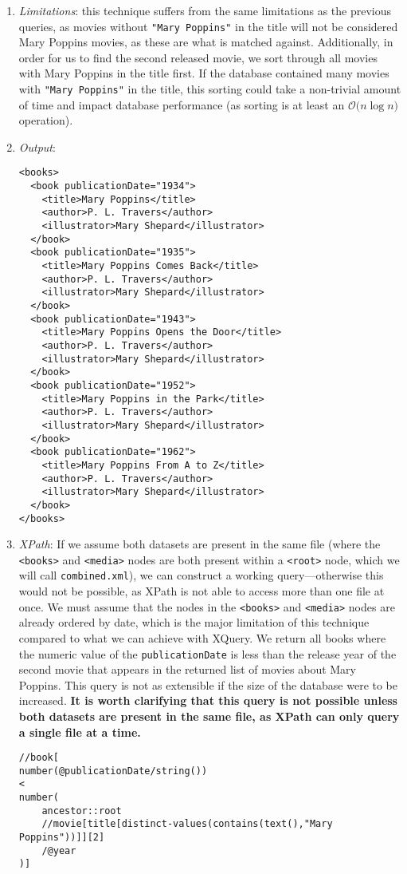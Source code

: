 \documentclass[11pt]{article}
\begin{document}
\begin{enumerate}
\item \textit{Limitations}: this technique suffers from the same limitations as the previous queries, as movies without \texttt{"Mary Poppins"} in the title will not be considered Mary Poppins movies, as these are what is matched against. Additionally, in order for us to find the second released movie, we sort through all movies with Mary Poppins in the title first. If the database contained many movies with \texttt{"Mary Poppins"} in the title, this sorting could take a non-trivial amount of time and impact database performance (as sorting is at least an $\mathcal{O}({n\log{n})}$ operation).
\item \textit{Output}:
\begin{verbatim} 
<books>
  <book publicationDate="1934">
    <title>Mary Poppins</title>
    <author>P. L. Travers</author>
    <illustrator>Mary Shepard</illustrator>
  </book>
  <book publicationDate="1935">
    <title>Mary Poppins Comes Back</title>
    <author>P. L. Travers</author>
    <illustrator>Mary Shepard</illustrator>
  </book>
  <book publicationDate="1943">
    <title>Mary Poppins Opens the Door</title>
    <author>P. L. Travers</author>
    <illustrator>Mary Shepard</illustrator>
  </book>
  <book publicationDate="1952">
    <title>Mary Poppins in the Park</title>
    <author>P. L. Travers</author>
    <illustrator>Mary Shepard</illustrator>
  </book>
  <book publicationDate="1962">
    <title>Mary Poppins From A to Z</title>
    <author>P. L. Travers</author>
    <illustrator>Mary Shepard</illustrator>
  </book>
</books>
\end{verbatim} 

\item \textit{XPath}: If we assume both datasets are present in the same file (where the \texttt{<books>} and \texttt{<media>} nodes are both present within a \texttt{<root>} node, which we will call \texttt{combined.xml}), we can construct a working query---otherwise this would not be possible, as XPath is not able to access more than one file at once. We must assume that the nodes in the \texttt{<books>} and \texttt{<media>} nodes are already ordered by date, which is the major limitation of this technique compared to what we can achieve with XQuery. We return all books where the numeric value of the \texttt{publicationDate} is less than the release year of the second movie that appears in the returned list of movies about Mary Poppins. This query is not as extensible if the size of the database were to be increased. \textbf{It is worth clarifying that this query is not possible unless both datasets are present in the same file, as XPath can only query a single file at a time.}

\begin{small}
\begin{verbatim}
//book[
number(@publicationDate/string())
<
number(
    ancestor::root
    //movie[title[distinct-values(contains(text(),"Mary Poppins"))]][2]
    /@year
)]
\end{verbatim}
\end{small}
\end{enumerate}
\end{document}
